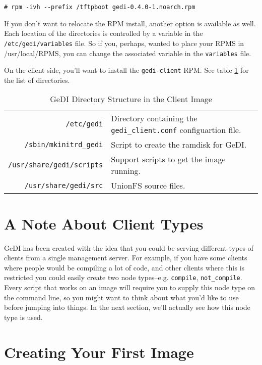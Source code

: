 \documentclass[10pt,a4paper,titlepage]{article}
\begin{document}
\begin{verbatim}
# rpm -ivh --prefix /tftpboot gedi-0.4.0-1.noarch.rpm
\end{verbatim}

If you don't want to relocate the RPM install, another option is available as
well.  Each location of the directories is controlled by a variable in the
\verb!/etc/gedi/variables! file.  So if you, perhaps, wanted to place your
RPMS in /usr/local/RPMS, you can change the associated variable in the
\verb!variables! file.

On the client side, you'll want to install the \verb!gedi-client! RPM.  See
table \ref{tab:clidir} for the list of directories.

\begin{table}[ht]
\centering
\caption{GeDI Directory Structure in the Client Image}
\begin{tabular}{rp{4in}}
\verb!/etc/gedi! & Directory containing the \verb!gedi_client.conf! configuartion file. \\
\verb!/sbin/mkinitrd_gedi! & Script to create the ramdisk for GeDI. \\
\verb!/usr/share/gedi/scripts! & Support scripts to get the image running. \\
\verb!/usr/share/gedi/src! & UnionFS source files. \\
\end{tabular}
\label{tab:clidir}
\end{table}

\section{A Note About Client Types}
GeDI has been created with the idea that you could be serving different types of
clients from a single management server.  For example, if you have some clients
where people would be compiling a lot of code, and other clients where this is
restricted you could easily create two node types--e.g. \verb!compile!,
\verb!not_compile!.  Every script that works on an image will require you to
supply this node type on the command line, so you might want to think about what
you'd like to use before jumping into things.  In the next section, we'll
actually see how this node type is used.

\section{Creating Your First Image}
\end{document}
